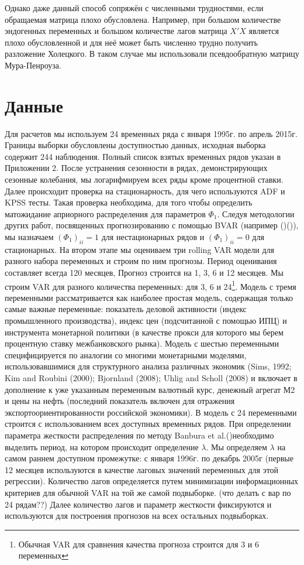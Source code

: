 \documentclass[11pt]{article} %
\begin{document}
Однако даже данный способ сопряжён с численными трудностями, если
обращаемая матрица плохо обусловлена. Например, при большом количестве
эндогенных переменных и большом количестве лагов матрица $X'X$
является плохо обусловленной и для неё может быть численно трудно
получить разложение Холецкого. В таком случае мы использовали
псевдообратную матрицу Мура-Пенроуза.


\section{Данные}

Для расчетов мы используем 24 временных ряда с января 1995г. по апрель 2015г. Границы выборки обусловлены доступностью данных, исходная выборка содержит 244 наблюдения. Полный список взятых временных рядов указан в Приложении 2. После устранения сезонности в рядах, демонстрирующих сезонные колебания, мы логарифмируем всех ряды кроме процентной ставки. Далее происходит проверка на стационарность, для чего используются ADF и KPSS тесты. Такая проверка необходима, для того чтобы определить матожидание априорного  распределения для параметров $\Phi_1$. Следуя методологии других работ, посвященных прогнозированию с помощью BVAR (например ()()), мы назначаем $(\Phi_1)_{ii}=1$  для  нестационарных рядов и $(\Phi_1)_{ii}=0$ для стационарных. 
На втором этапе мы оцениваем три rolling VAR модели для разного набора переменных и строим по ним прогнозы. Период  оценивания составляет всегда 120 месяцев, Прогноз строится на 1, 3, 6 и 12 месяцев.  Мы строим VAR  для разного количества переменных: для 3, 6 и 24\footnote{Обычная VAR для сравнения качества прогноза строится для 3 и 6 переменных}. Модель с тремя переменными рассматривается как наиболее простая модель, содержащая только самые важные  переменные: показатель деловой активности (индекс промышленного производства),  индекс цен (подсчитанной с помощью ИПЦ) и  инструмента монетарной политики (в качестве прокси для которого мы берем процентную ставку межбанковского рынка). Модель с шестью переменными специфицируется по аналогии со многими монетарными моделями, использовавшимися для структурного анализа различных экономик (Sims, 1992; Kim and Roubini (2000); Bjornland (2008); Uhlig and Scholl (2008) и включает  в дополнение к уже указанным переменным валютный курс, денежный агрегат М2 и цены на нефть (последний показатель включен для отражения экспортоориентированности российской экономики). В модель с 24 переменными строится с использованием всех доступных временных рядов. 
При определении параметра жесткости распределения по методу Banbura et al.()необходимо выделить период, на котором происходит определение $\lambda$. Мы определяем $\lambda$ на самом раннем доступном промежутке: с января 1996г. по декабрь 2005г (первые 12 месяцев используются в качестве лаговых значений переменных для этой регрессии). Количество лагов определяется путем минимизации информационных критериев для обычной VAR на той же самой подвыборке. (что делать с вар по 24 рядам??) Далее количество лагов и параметр жесткости фиксируются и используются для построения прогнозов на всех остальных подвыборках. 
\end{document}
